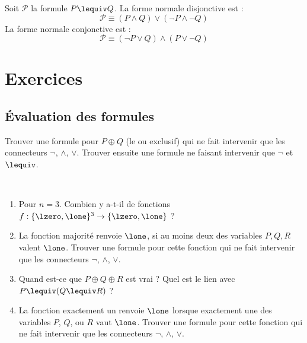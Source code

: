 \documentclass[11pt,class=report,crop=false]{standalone}
\begin{document}
\begin{exemple}
	Soit $\mathcal{P}$ la formule $P \lequiv Q$.
	La forme normale disjonctive est :
	\[
	\mathcal{P} \equiv (P \land Q) \lor (\lnot P \land \lnot Q)
	\]
	La forme normale conjonctive est :
	\[
	\mathcal{P} \equiv (\lnot P \lor Q) \land (P \lor \lnot Q)
	\]	
\end{exemple}



\section*{Exercices}

\subsection*{Évaluation des formules}

\begin{exercicecours}
	Trouver une formule pour $P \oplus Q$ (le ou exclusif) qui ne fait intervenir que les connecteurs $\lnot$, $\land$, $\lor$.
	Trouver ensuite une formule ne faisant intervenir que $\lnot$ et $\lequiv$.
\end{exercicecours}

\begin{exercicecours}
	~
	\begin{enumerate}
		\item Pour $n=3$. Combien y a-t-il de fonctions $f : \{\lzero,\lone\}^3 \to \{\lzero,\lone\}$ ?
		
		\item La fonction \og{}majorité\fg{} renvoie $\lone$, si au moins deux des variables $P,Q,R$ valent $\lone$. Trouver une formule pour cette fonction qui ne fait intervenir que les connecteurs $\lnot$, $\land$, $\lor$.
		
		\item Quand est-ce que $P \oplus Q \oplus R$ est vrai ?
		Quel est le lien avec $P \lequiv (Q \lequiv R)$ ?
		
		\item La fonction \og{}exactement un\fg{} renvoie $\lone$ lorsque exactement une des variables $P$, $Q$, ou $R$ vaut $\lone$. Trouver une formule pour cette fonction qui ne fait intervenir que les connecteurs $\lnot$, $\land$, $\lor$.
	\end{enumerate}
	
\end{exercicecours}
\end{document}
